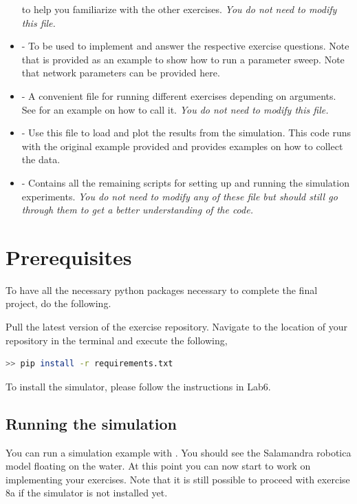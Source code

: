 \documentclass{cmc}
\begin{document}
\begin{itemize}
  to help you familiarize with the other exercises. \textit{You do not need to
    modify this file.}
\item {} - To be used to implement and answer the
  respective exercise questions. Note that  is
  provided as an example to show how to run a parameter sweep. Note that network
  parameters can be provided here.
\item {} - A convenient file for running different
  exercises depending on arguments. See  for an example
  on how to call it. \textit{You do not need to modify this file.}
\item {} - Use this file to load and plot the
  results from the simulation. This code runs with the original example provided
  and provides examples on how to collect the data.
\item {} - Contains all the remaining
  scripts for setting up and running the simulation experiments. \textit{You do
    not need to modify any of these file but should still go through them to get
    a better understanding of the code.}
\end{itemize}


\section*{Prerequisites}
To have all the necessary python packages necessary to complete the
final project, do the following.

Pull the latest version of the exercise repository. Navigate to the
location of your repository in the terminal and execute the following,

\begin{lstlisting}[language=Bash]
  >> pip install -r requirements.txt
\end{lstlisting}

To install the simulator, please follow the instructions in Lab6.

\subsection*{Running the simulation}
You can run a simulation example with . You
should see the Salamandra robotica model floating on the water. At this point
you can now start to work on implementing your exercises. Note that it is still
possible to proceed with exercise 8a if the simulator is not installed yet.
\end{document}

